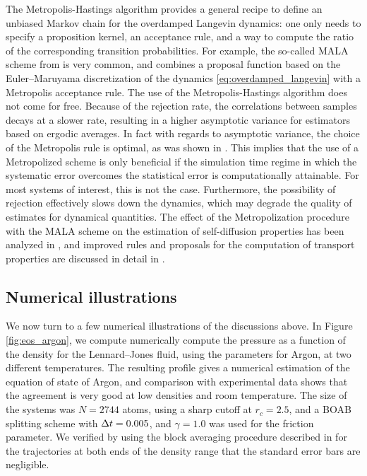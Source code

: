     \begin{remark}
    The Metropolis-Hastings algorithm provides a general recipe to define an unbiased Markov chain for the overdamped Langevin dynamics: one only needs to specify a proposition kernel, an acceptance rule, and a way to compute the ratio of the corresponding transition probabilities.
    For example, the so-called MALA scheme from \cite{RDF78} is very common, and combines a proposal function based on the Euler--Maruyama discretization of the dynamics \eqref{eq:overdamped_langevin} with a Metropolis acceptance rule.
    The use of the Metropolis-Hastings algorithm does not come for free. Because of the rejection rate, the correlations between samples decays at a slower rate, resulting in a higher asymptotic variance for estimators based on ergodic averages.
    In fact with regards to asymptotic variance, the choice of the Metropolis rule is optimal, as was shown in \cite{P73}.
    This implies that the use of a Metropolized scheme is only beneficial if the simulation time regime in which the systematic error overcomes the statistical error is computationally attainable. 
    For most systems of interest, this is not the case.
    Furthermore, the possibility of rejection effectively slows down the dynamics, which may degrade the quality of estimates for dynamical quantities.
    The effect of the Metropolization procedure with the MALA scheme on the estimation of self-diffusion properties has been analyzed in \cite{FHG15}, and improved rules and proposals for the computation of transport properties are discussed in detail in \cite{FG16}. 
    \end{remark}

    \subsection{Numerical illustrations}
    We now turn to a few numerical illustrations of the discussions above.
    In Figure \ref{fig:eos_argon}, we compute numerically compute the pressure as a function of the density for the Lennard--Jones fluid, using the parameters for Argon, at two different temperatures. 
    The resulting profile gives a numerical estimation of the equation of state of Argon, and comparison with experimental data shows that the agreement is very good at low densities and room temperature.
    The size of the systems was $N=2744$ atoms, using a sharp cutoff at $r_c=2.5$, and a BOAB splitting scheme with ${\Delta t}=0.005$, and $\gamma=1.0$ was used for the friction parameter.
    We verified by using the block averaging procedure described in \cite{FP89} for the trajectories at both ends of the density range that the standard error bars are negligible.

